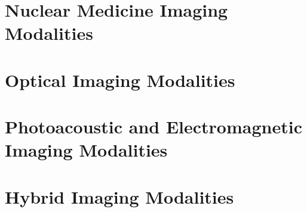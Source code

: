 \documentclass[12pt,oneside]{book}
\begin{document}
\part{Nuclear Medicine Imaging Modalities}





\part{Optical Imaging Modalities}

















\part{Photoacoustic and Electromagnetic Imaging Modalities}






\part{Hybrid Imaging Modalities}





\appendix


\backmatter
\printindex
\end{document}
